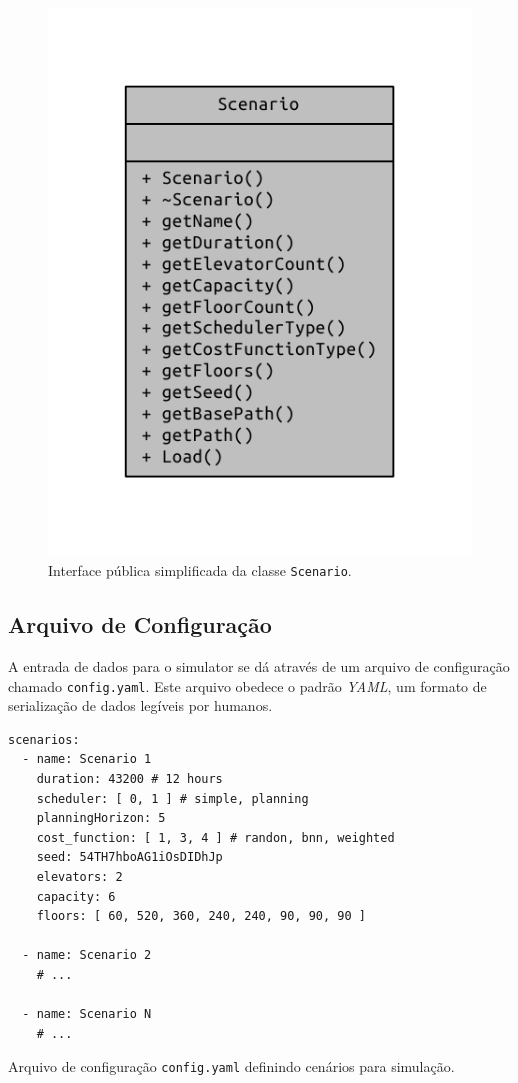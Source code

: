 \begin{figure}[htb!]
  \centering
  \includegraphics{doc/latex/class_scenario__coll__graph}
  \caption{Interface pública simplificada da classe \texttt{Scenario}.}
\label{fig:diagram:scenario}
\end{figure}

\subsection{\label{model:scenario:config}Arquivo de Configuração}

A entrada de dados para o simulator se dá através de um arquivo de configuração
chamado \texttt{config.yaml}. Este arquivo obedece o padrão \textit{YAML}, um
formato de serialização de dados legíveis por humanos.

\begin{algorithm}[htb]
  \centering
    \begin{verbatim}
scenarios:
  - name: Scenario 1
    duration: 43200 # 12 hours
    scheduler: [ 0, 1 ] # simple, planning
    planningHorizon: 5
    cost_function: [ 1, 3, 4 ] # randon, bnn, weighted
    seed: 54TH7hboAG1iOsDIDhJp
    elevators: 2
    capacity: 6
    floors: [ 60, 520, 360, 240, 240, 90, 90, 90 ]

  - name: Scenario 2
    # ...

  - name: Scenario N
    # ...
    \end{verbatim}
  \caption{Arquivo de configuração \texttt{config.yaml} definindo cenários para simulação.}
  \label{alg:config}
\end{algorithm}

